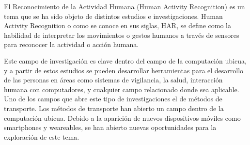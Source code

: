 
El Reconocimiento de la Actividad Humana\cite{Humanactivityrecognition} (Human Activity Recognition) es un tema que se ha sido objeto de distintos estudios e investigaciones. 
Human Activity Recognition o como se conoce en sus siglas, HAR, se define como la habilidad de interpretar los movimientos o gestos humanos a través de sensores para reconocer la actividad o acción humana.\cite{10.1007/s11390-011-9430-9}

Este campo de investigación es clave dentro del campo de la computación ubicua\cite{10.5555/2832747.2832806}, y a partir de estos estudios se pueden desarrollar herramientas para el desarrollo de las personas en áreas como sistemas de vigilancia\cite{10.1007/s11390-011-9430-9}, la salud\cite{10.1145/3195106.3195157}, interacción humana con computadores\cite{10.1007/s11390-011-9430-9}, y cualquier campo relacionado donde sea aplicable. \newline
Uno de los campos que abre este tipo de investigaciones el de métodos de transporte\cite{Efthymiou2019}. Los métodos de transporte han abierto un campo dentro de la computación ubicua. Debido a la aparición de nuevos dispositivos móviles como smartphones y weareables, se han abierto nuevas oportunidades para la exploración de este tema.














